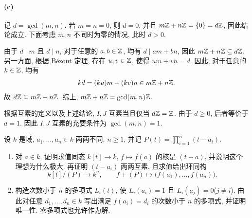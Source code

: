\documentclass{article}
\begin{document}
\begin{solution}
	\paragraph{(c)} 记 $d = \gcd(m,n)$. 若 $m = n = 0$, 则 $d = 0$, 并且 $m\mathbb{Z} + n\mathbb{Z} = \{0\} = d\mathbb{Z}$, 因此结论成立. 下面考虑 $m, n$ 不同时为零的情况, 此时 $d > 0$.

	由于 $d \mid m$ 且 $d \mid n$, 对于任意的 $a, b \in \mathbb{Z}$, 均有 $d \mid am + bn$, 因此 $m\mathbb{Z} + n\mathbb{Z} \subseteq d\mathbb{Z}$. 另一方面, 根据 B\'ezout 定理, 存在 $u, v \in \mathbb{Z}$, 使得 $um + vn = d$. 因此, 对于任意的 $k \in \mathbb{Z}$, 均有
	\[ kd = (ku)m + (kv)n \in m\mathbb{Z} + n\mathbb{Z}. \]
	故 $d\mathbb{Z} \subseteq m\mathbb{Z} + n\mathbb{Z}$. 综上, $m\mathbb{Z} + n\mathbb{Z} = \gcd(m,n)\mathbb{Z}$.

	根据互素的定义以及上述结论, $I, J$ 互素当且仅当 $d\mathbb{Z} = \mathbb{Z}$. 由于 $d \ge 0$, 后者等价于 $d = 1$. 因此 $I, J$ 互素的充要条件为 $\gcd(m,n) = 1$.
\end{solution}



\begin{problem}
设 $k$ 是域, $a_1,\ldots,a_n\in k$ 两两不同, $n\geq 1$, 并记 $P(t)=\prod_{i=1}^n(t-a_i)$.
\begin{enumerate}
  \item[(a)] 对 $a\in k$, 证明求值同态 $k[t]\to k$, $f\mapsto f(a)$ 的核是 $(t-a)$, 并说明这个理想为什么极大. 再证明 $(t-a_i)$ 两两互素, 且求值给出环同构
  \[
    k[t]/(P)\longrightarrow k^n,\qquad f+(P)\longmapsto\bigl(f(a_1),\ldots,f(a_n)\bigr).
  \]
  \item[(b)] 构造次数小于 $n$ 的多项式 $L_i(t)$, 使 $L_i(a_i)=1$ 且 $L_i(a_j)=0$($j\neq i$). 由此对任意 $d_1,\ldots,d_n\in k$ 写出满足 $f(a_i)=d_i$ 的次数小于 $n$ 的多项式, 并证明唯一性. 零多项式也允许作为解.
\end{enumerate}
\end{problem}
\end{document}
